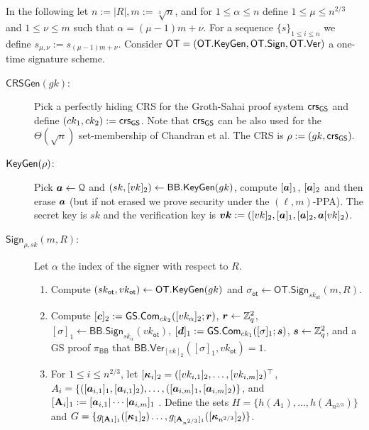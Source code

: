 
In the following let $n:=|R|, m:=\sqrt[3]{n}$, and for $1\leq \alpha\leq n$ define $1\leq \mu \leq n^{2/3}$ and $1\leq \nu\leq m$ such that $\alpha=(\mu-1)m+\nu$. For a sequence $\{s\}_{1\leq i\leq n}$ we define $s_{\mu,\nu}:=s_{(\mu-1)m+\nu}$. Consider $\mathsf{OT}=(\mathsf{OT}.\mathsf{KeyGen},\mathsf{OT}.\mathsf{Sign},\allowbreak\mathsf{OT}.\mathsf{Ver})$ a one-time signature scheme.

\begin{description}
\item[$\mathsf{CRSGen}(gk)$:] Pick a perfectly hiding CRS for the Groth-Sahai proof system $\mathsf{crs}_{\mathsf{GS}}$ and define $(ck_1,ck_2):=\mathsf{crs}_{\mathsf{GS}}$. Note that $\mathsf{crs}_{\mathsf{GS}}$ can be also used for the $\Theta(\sqrt{n})$ set-membership of Chandran et al. The CRS is $\rho:=(gk,\mathsf{crs}_{\mathsf{GS}}).$

\item[$\mathsf{KeyGen}(\rho)$:] Pick ${\boldsymbol{a}}\gets\mathcal{Q}$ and $(sk,[vk]_2)\gets\mathsf{BB}.\mathsf{KeyGen}(gk)$, compute $[{\boldsymbol{a}}]_1$, $[{\boldsymbol{a}}]_2$ and then erase ${\boldsymbol{a}}$ (but if not erased we prove security under the $(\ell,m)$-PPA). The secret key is $sk$ and the verification key is ${\boldsymbol{vk}}:=([vk]_2,[{\boldsymbol{a}}]_1,[{\boldsymbol{a}}]_2,{\boldsymbol{a}}[vk]_2)$.

\item[$\mathsf{Sign}_{\rho,sk}(m,R)$:] Let $\alpha$ the index of the signer with respect to $R$.
\begin{enumerate}
\item Compute $(sk_\mathsf{ot},vk_\mathsf{ot})\gets\mathsf{OT}.\mathsf{KeyGen}(gk)$ and $\sigma_\mathsf{ot}\gets\allowbreak\mathsf{OT}.\allowbreak\mathsf{Sign}_{sk_\mathsf{ot}}(m,R)$.

\item Compute $[{\boldsymbol{c}}]_2:={\mathsf{GS}}.\mathsf{Com}_{ck_2}([vk_\alpha]_2;{\boldsymbol{r}})$, ${\boldsymbol{r}}\gets\mathbb{Z}_q^2$, $[\sigma]_1\gets\mathsf{BB}.\mathsf{Sign}_{sk_\alpha}(vk_\mathsf{ot})$, $[{\boldsymbol{d}}]_1:={\mathsf{GS}}.\mathsf{Com}_{ck_1}([\sigma]_1;{\boldsymbol{s}})$, ${\boldsymbol{s}}\gets\mathbb{Z}_q^2$, and a GS proof $\pi_\mathsf{BB}$ that $\mathsf{BB}.\mathsf{Ver}_{[vk]_2}(\allowbreak[\sigma]_1,vk_\mathsf{ot})=1$.

\item For $1\leq i \leq n^{2/3}$, let $[{\boldsymbol{\kappa}}_i]_2=([vk_{i,1}]_2,\ldots,[vk_{i,m}]_2)^\top$, $A_i=\{([{\boldsymbol{a}}_{i,1}]_1,[{\boldsymbol{a}}_{i,1}]_2),\allowbreak\ldots,\allowbreak([{\boldsymbol{a}}_{i,m}]_1,[{\boldsymbol{a}}_{i,m}]_2)\}$, and $[\mathbf{{A}}_i]_1:=[{\boldsymbol{a}}_{i,1}|\cdots|{\boldsymbol{a}}_{i,m}]_1$ . Define the sets
$H=\{h(A_1),\allowbreak\ldots,\allowbreak h(A_{n^{2/3}})\}$ and
$G=\{
	g_{[\mathbf{{A}}_1]_1}([{\boldsymbol{\kappa}}_1]_2)
	\allowbreak\ldots,\allowbreak
	g_{[\mathbf{{A}}_{n^{2/3}}]_1}([{\boldsymbol{\kappa}}_{n^{2/3}}]_2)\}$.


\end{enumerate}
\end{description}
